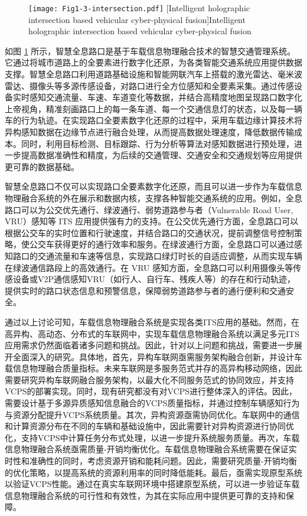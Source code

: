 \begin{figure}[h] 
	\centering
	\texttt{[image: Fig1-3-intersection.pdf]}
	[Intelligent holographic intersection based vehicular cyber-physical fusion]{Intelligent holographic intersection based vehicular cyber-physical fusion}
	\label{fig 1-3}
\end{figure}

如图 \ref{fig 1-3} 所示，智慧全息路口是基于车载信息物理融合技术的智慧交通管理系统。它通过将城市道路上的全要素进行数字化还原，为各类智能交通系统应用提供数据支撑。智慧全息路口利用道路基础设施和智能网联汽车上搭载的激光雷达、毫米波雷达、摄像头等多源传感设备，对路口进行全方位感知和全要素采集。通过传感设备实时感知交通流量、车速、车道变化等数据，并结合高精度地图呈现路口数字化上帝视角，精准刻画路口上的每一条车道、每一个交通信息灯的状态，以及每一辆车的行为轨迹。在实现路口全要素数字化还原的过程中，采用车载边缘计算技术将异构感知数据在边缘节点进行融合处理，从而提高数据处理速度，降低数据传输成本。同时，利用目标检测、目标跟踪、行为分析等算法对感知数据进行预处理，进一步提高数据准确性和精度，为后续的交通管理、交通安全和交通规划等应用提供更可靠的数据基础。

智慧全息路口不仅可以实现路口全要素数字化还原，而且可以进一步作为车载信息物理融合系统的外在展示和数据内核，支撑各种智能交通系统的应用。例如，全息路口可以为公交优先通行、绿波通行、弱势道路参与者（Vulnerable Road User, VRU）感知等 ITS 应用提供强有力的支持。在公交优先通行方面，全息路口可以根据公交车的实时位置和行驶速度，并结合路口的交通状况，提前调整信号控制策略，使公交车获得更好的通行效率和服务。在绿波通行方面，全息路口可以通过感知路口的交通流量和车速等信息，实现路口绿灯时长的自适应调整，从而实现车辆在绿波通信路段上的高效通行。在 VRU 感知方面，全息路口可以利用摄像头等传感设备或V2P通信感知VRU（如行人、自行车、残疾人等）的存在和行动轨迹，提供实时的路口状态信息和预警信息，保障弱势道路参与者的通行便利和交通安全。

通过以上讨论可知，车载信息物理融合系统是实现各类ITS应用的基础。然而，在高异构、高动态、分布式的车联网中，实现车载信息物理融合系统以满足多元ITS应用需求仍然面临着诸多问题和挑战。因此，针对以上问题和挑战，需要进一步展开全面深入的研究。具体地，首先，异构车联网亟需服务架构融合创新，并设计车载信息物理融合质量指标。未来车联网是多服务范式并存的高异构移动网络，因此需要研究异构车联网融合服务架构，以最大化不同服务范式的协同效应，并支持VCPS的部署实现。同时，现有研究都没有对VCPS进行整体深入的评估。因此，需要设计基于多源异质感知信息融合的VCPS质量指标，并通过控制车辆感知行为与资源分配提升VCPS系统质量。其次，异构资源亟需协同优化。车联网中的通信和计算资源分布在不同的车辆和基础设施中，因此需要针对异构资源进行协同优化，支持VCPS中计算任务分布式处理，以进一步提升系统服务质量。再次，车载信息物理融合系统亟需质量-开销均衡优化。车载信息物理融合系统需要在保证实时性和准确性的同时，考虑资源开销和能耗问题。因此，需要研究质量-开销均衡的优化策略，以提高系统的资源利用率的同时降低能耗。最后，亟需实现原型系统以验证VCPS性能。通过在真实车联网环境中搭建原型系统，可以进一步验证车载信息物理融合系统的可行性和有效性，为其在实际应用中提供更可靠的支持和保障。

